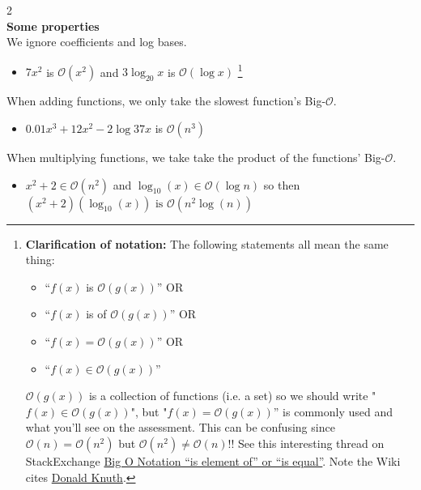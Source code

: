 \documentclass{exam}
\begin{document}
\begin{multicols}{2}
        \\ \textbf{Some properties} \\
            We ignore coefficients and log bases. 
                \begin{itemize}
                    \item [\textbf{ex.}] $7x^{2}$ is $\mathcal{O}(x^{2})$ and $3\log_{20}{x}$ is $\mathcal{O}(\log{x})$ 
                        \footnote[7]{\textbf{Clarification of notation: }The following statements all mean the same thing:
                            \begin{itemize}
                                \item[] “$f(x)$ is $\mathcal{O}(g(x))$” OR  
                                \item[] “$f(x)$ is of $\mathcal{O}(g(x))$” OR 
                                \item[] “$f(x)=\mathcal{O}(g(x))$” OR
                                \item[] “$f(x)\in \mathcal{O}(g(x))$” 
                            \end{itemize}
                        $\mathcal{O}(g(x))$ is a collection of functions (i.e. a set) so we should write "$f(x)\in \mathcal{O}(g(x))$", but "$f(x)=\mathcal{O}(g(x))$” is commonly used and what you'll see on the assessment. This can be confusing since $\mathcal{O}(n)=\mathcal{O}(n^{2})$ but $\mathcal{O}(n^{2})\neq \mathcal{O}(n)$!! See this interesting thread on StackExchange \href{https://math.stackexchange.com/questions/2066004/big-o-notation-is-element-of-or-is-equal}{Big O Notation “is element of” or “is equal”}. Note the Wiki cites \href{https://en.wikipedia.org/wiki/Donald_Knuth}{Donald Knuth}.
                        } 
                \end{itemize}
        
            When adding functions, we only take the slowest function's Big-$\mathcal{O}$.
            \begin{itemize}
                \item[\textbf{ex.}] $0.01x^3+12x^{2}-2\log{37x}$ is $\mathcal{O}(n^{3})$
            \end{itemize}
            
            When multiplying functions, we take take the product of the functions' Big-$\mathcal{O}$. 
            \begin{itemize}
                \item[\textbf{ex.}] $x^{2}+2\in \mathcal{O}(n^{2})$ and $\log_{10}(x)\in \mathcal{O}(\log{n})$ so then \\
                $(x^{2}+2)(\log_{10}(x)) \text{ is } \mathcal{O}(n^{2} \log(n))$
            \end{itemize}
    \end{multicols}
    
\end{document}
